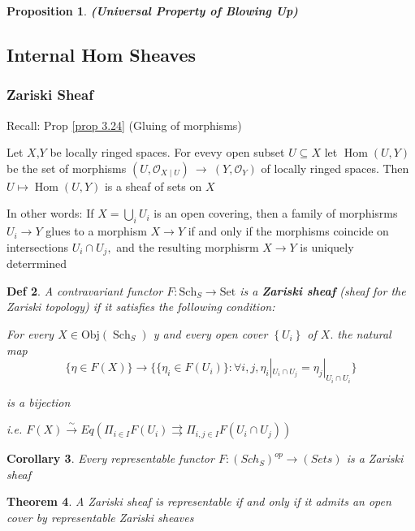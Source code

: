 \documentclass{article}
\newtheorem{theorem}{Theorem}[section]
\newtheorem{definition}[theorem]{Def}
\newtheorem{corollary}[theorem]{Corollary}
\newtheorem{proposition}[theorem]{Proposition}
\begin{document}
\begin{proposition}
\textbf{(Universal Property of Blowing Up)}
\end{proposition}


\newpage
\subsection{Internal Hom Sheaves}
\subsubsection{Zariski Sheaf}
Recall:
Prop \ref{prop 3.24} (Gluing of morphisms) 
    
    Let $X$,$Y$ be locally ringed spaces. For evevy open subset $U\subseteq X$ let $\operatorname{Hom}(U,Y)$ be the set of morphisms $(U,{\mathcal{O}}_{X\mid U})\ \to\ (Y,{\mathcal{O}}_{Y})$ of locally ringed spaces. Then $U\mapsto\operatorname{Hom}(U,Y)$ is a sheaf of sets on $X$ 

In other words: If $X=\bigcup_{i}U_{i}$ is an open covering, then a family of morphisrms $U_{i}\to Y$ glues to a morphism $X\to Y$ if and only if the morphisms coincide on intersections $U_{i}\cap U_{j},$ and the resulting morphisrm $X\to Y$ is uniquely deterrmined


\begin{definition}
A contravariant functor $F:\mathrm{Sch}_{S}\rightarrow\mathrm{Set}$ is a \textbf{Zariski sheaf} (sheaf for the
Zariski topology) if it satisfies the following condition:
    
For every $X\in{\mathrm{Obj}}(\operatorname{Sch}_{S})$ y and every open cover $\left\{U_{i}\right\}$ of $X.$ the natural map
$$
\{\eta\in F(X)\}\to\{\{\eta_{i}\in F(U_{i})\}:\forall i,j,\eta_{i}|_{U_{i}\cap U_{j}}=\eta_{j}|_{U_{i}\cap U_{i}}\} 
$$

is a bijection

i.e. $F(X)\xrightarrow{\sim}Eq(\Pi_{i\in I}F(U_i)\rightrightarrows \Pi_{i,j\in I}F(U_i\cap U_j))$
\end{definition}

\begin{corollary}
Every representable functor $F : (Sch_S)
^{op} \to (Sets)$ is a Zariski sheaf 
\end{corollary}

\begin{theorem}
    A Zariski sheaf is representable if and only if it admits an open cover by representable Zariski sheaves
\end{theorem}
\end{document}
